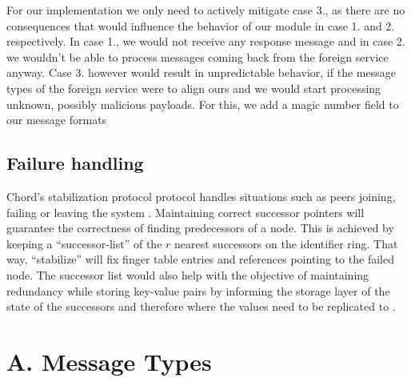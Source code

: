 \documentclass[a4paper, 11pt]{article}
\begin{document}
For our implementation we only need to actively mitigate case 3., as there are no consequences that would influence the behavior of our module in case 1. and 2. respectively. In case 1., we would not receive any response message and in case 2. we wouldn't be able to process messages coming back from the foreign service anyway. Case 3. however would result in unpredictable behavior, if the message types of the foreign service were to align ours and we would start processing unknown, possibly malicious payloads. For this, we add a magic number field to our message formats 

\subsection*{Failure handling}
Chord's stabilization protocol protocol handles situations such as peers joining, failing or leaving the system \cite{ChordPaper}. Maintaining correct successor pointers will guarantee the correctness of finding predecessors of a node. This is achieved by keeping a ``successor-list'' of the $r$ nearest successors on the identifier ring. That way, ``stabilize'' will fix finger table entries and references pointing to the failed node. The successor list would also help with the objective of maintaining redundancy while storing key-value pairs by informing the storage layer of the state of the successors and therefore where the values need to be replicated to \cite{ChordPaper}. 





\pagebreak

\section*{A. Message Types}

\end{document}
